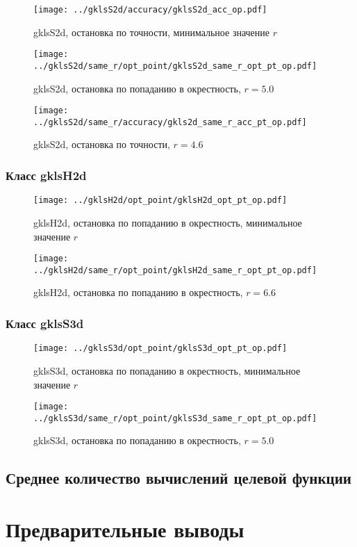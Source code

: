 \documentclass[a4paper]{article}
\begin{document}
\begin{figure}[H]
  \center
  \texttt{[image: ../gklsS2d/accuracy/gklsS2d\_acc\_op.pdf]}
  \caption{gklsS2d, остановка по точности, минимальное значение $r$}
  \label{fig:}
\end{figure}

\begin{figure}[H]
  \center
  \texttt{[image: ../gklsS2d/same\_r/opt\_point/gklsS2d\_same\_r\_opt\_pt\_op.pdf]}
  \caption{gklsS2d, остановка по попаданию в окрестность, $r=5.0$}
  \label{fig:}
\end{figure}

\begin{figure}[H]
  \center
  \texttt{[image: ../gklsS2d/same\_r/accuracy/gkls2d\_same\_r\_acc\_pt\_op.pdf]}
  \caption{gklsS2d, остановка по точности, $r=4.6$}
  \label{fig:}
\end{figure}

\subsubsection{Класс gklsH2d}

\begin{figure}
  \center
  \texttt{[image: ../gklsH2d/opt\_point/gklsH2d\_opt\_pt\_op.pdf]}
  \caption{gklsH2d, остановка по попаданию в окрестность, минимальное значение $r$}
  \label{fig:}
\end{figure}

\begin{figure}[H]
  \center
  \texttt{[image: ../gklsH2d/same\_r/opt\_point/gklsH2d\_same\_r\_opt\_pt\_op.pdf]}
  \caption{gklsH2d, остановка по попаданию в окрестность, $r=6.6$}
  \label{fig:}
\end{figure}

\subsubsection{Класс gklsS3d}

\begin{figure}
  \center
  \texttt{[image: ../gklsS3d/opt\_point/gklsS3d\_opt\_pt\_op.pdf]}
  \caption{gklsS3d, остановка по попаданию в окрестность, минимальное значение $r$}
  \label{fig:}
\end{figure}

\begin{figure}[H]
  \center
  \texttt{[image: ../gklsS3d/same\_r/opt\_point/gklsS3d\_same\_r\_opt\_pt\_op.pdf]}
  \caption{gklsS3d, остановка по попаданию в окрестность, $r=5.0$}
  \label{fig:}
\end{figure}

\subsection{Среднее количество вычислений целевой функции}

\section{Предварительные выводы}
\end{document}
